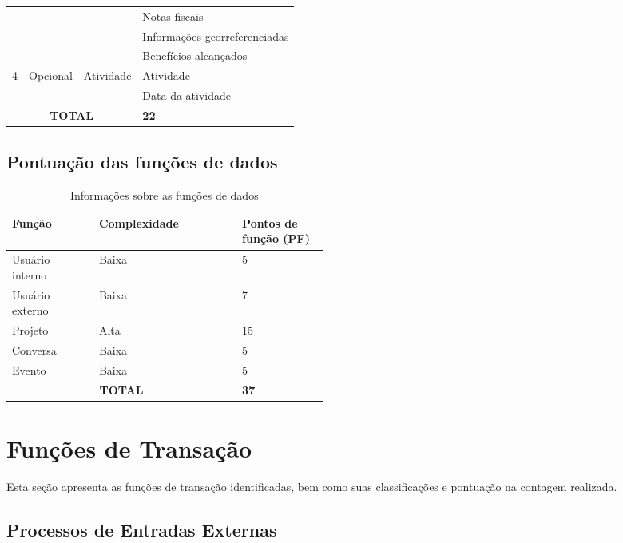\begin{table}[!h]
\begin{tabular}{|c|c|l|}
				      &				 & Notas fiscais \\ \cline{3-3} 
				      &  				 & Informações georreferenciadas \\ \cline{3-3}         
				      &                              & Benefícios alcançados    \\ \hline
		\multirow{2}{*}{4}         &\multirow{2}{*}{Opcional - Atividade}    & Atividade \\ \cline{3-3}
				      &				& Data da atividade \\ \hline
	  \multicolumn{2}{|c|}{\textbf{TOTAL}} & \textbf{22} \\ \hline
	  \end{tabular}
	  \end{table}
      
  \subsection{Pontuação das funções de dados}
  
      \begin{table}[!h]
      \centering
      \caption{Informações sobre as funções de dados}
      \label{funcoes_dados}
	\begin{tabular}{|p{0.12\linewidth}|p{0.20\linewidth}|p{0.14\linewidth}|}
	\hline
	\textbf{Função} & \textbf{Complexidade} & \textbf{Pontos de função (PF)} \\
	\hline
	Usuário interno & Baixa & 5 \\
	\hline
	Usuário externo & Baixa & 7 \\
	\hline
	Projeto & Alta & 15 \\
	\hline
	Conversa & Baixa & 5 \\
	\hline
	Evento & Baixa & 5 \\
	\hline
	\multicolumn{2}{|c|}{\textbf{TOTAL}} & \textbf{37} \\ \cline{3-3}
	\hline
	\end{tabular}
      \end{table}

\vfill
\pagebreak
\section{Funções de Transação}
  
 Esta seção apresenta as funções de transação identificadas, bem como suas classificações e pontuação na contagem realizada.
  
  \subsection{Processos de Entradas Externas}
  
